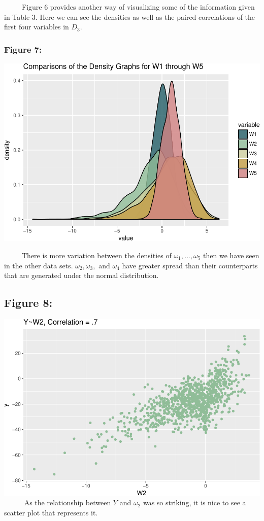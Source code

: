 \documentclass[12pt,twoside]{reedthesis}
\begin{document}
  ~~~~~Figure 6 provides another way of visualizing some of the
  information given in Table 3. Here we can see the densities as well as
  the paired correlations of the first four variables in \(D_3\).
  
  \subsubsection{Figure 7:}\label{figure-7}
  
  \includegraphics{Thesis_files/figure-latex/fig7-1.pdf}
  
  ~~~~~There is more variation between the densities of
  \(\omega_1,...,\omega_5\) then we have seen in the other data sets.
  \(\omega_2,\omega_3,\) and \(\omega_4\) have greater spread than their
  counterparts that are generated under the normal distribution.
  
  \subsection{Figure 8:}\label{figure-8}
  
  \includegraphics{Thesis_files/figure-latex/fig8-1.pdf} ~~~~~ As the
  relationship between \(Y\) and \(\omega_2\) was so striking, it is nice
  to see a scatter plot that represents it.
  
\end{document}

